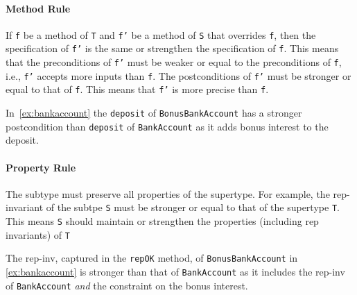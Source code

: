 \documentclass[oneside,11pt,dvipsnames]{book}
\newcommand{\code}[1]{\texttt{#1}}
\begin{document}
\paragraph{Method Rule} 
If \code{f} be a method of \code{T} and \code{f'} be a method of \code{S} that overrides \code{f}, then 
the specification of \code{f'} is the same or strengthen the specification of \code{f}. This means that the preconditions of \code{f'} must be weaker or equal to the preconditions of \code{f}, i.e.,  \code{f'} accepts more inputs than \code{f}.  The postconditions of \code{f'} must be stronger or equal to that of \code{f}. This means that \code{f'} is more precise than \code{f}.

In~\autoref{ex:bankaccount} the \code{deposit} of \code{BonusBankAccount} has a stronger postcondition than \code{deposit} of \code{BankAccount} as it adds bonus interest to the deposit.

\paragraph{Property Rule} The subtype must preserve all properties of the supertype.  For example, the rep-invariant of the subtpe \code{S} must be stronger or equal to that of the supertype \code{T}. This means \code{S} should maintain or strengthen the properties (including rep invariants) of \code{T}


The rep-inv, captured in the \code{repOK} method, of \code{BonusBankAccount} in \autoref{ex:bankaccount} is stronger than that of \code{BankAccount} as it includes the rep-inv of \code{BankAccount} \emph{and} the constraint on the bonus interest.
\end{document}
